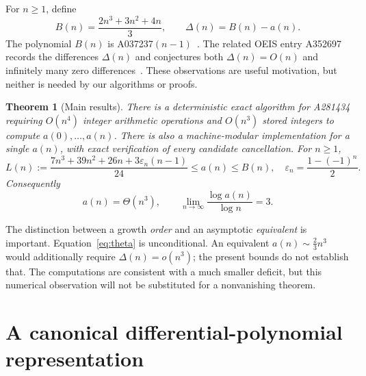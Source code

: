 \documentclass[11pt]{article}
\numberwithin{equation}{section}
\newtheorem{theorem}{Theorem}[section]
\theoremstyle{definition}
\theoremstyle{remark}
\newcommand{\epsn}{\varepsilon_n}
\begin{document}
For $n\ge1$, define
\begin{equation}\label{eq:B}
 B(n)=\frac{2n^3+3n^2+4n}{3},\qquad
 \Delta(n)=B(n)-a(n).
\end{equation}
The polynomial $B(n)$ is A037237$(n-1)$~\cite{oeis037237}. The related OEIS
entry A352697 records the differences $\Delta(n)$ and conjectures both
$\Delta(n)=O(n)$ and infinitely many zero differences~\cite{oeis352697}.
These observations are useful motivation, but neither is needed by our
algorithms or proofs.

\begin{theorem}[Main results]\label{thm:main}
There is a deterministic exact algorithm for A281434 requiring $O(n^4)$
integer arithmetic operations and $O(n^3)$ stored integers to compute
$a(0),\ldots,a(n)$. There is also a machine-modular implementation for a
single $a(n)$, with exact verification of every candidate cancellation.
For $n\ge1$,
\begin{equation}\label{eq:mainbounds}
 L(n):=\frac{7n^3+39n^2+26n+3\epsn(n-1)}{24}
 \le a(n)\le B(n),
 \quad \epsn=\frac{1-(-1)^n}{2}.
\end{equation}
Consequently
\begin{equation}\label{eq:theta}
 a(n)=\Theta(n^3),\qquad
 \lim_{n\to\infty}\frac{\log a(n)}{\log n}=3.
\end{equation}
\end{theorem}

The distinction between a growth \emph{order} and an asymptotic
\emph{equivalent} is important. Equation~\eqref{eq:theta} is unconditional.
An equivalent $a(n)\sim\tfrac23n^3$ would additionally require
$\Delta(n)=o(n^3)$; the present bounds do not establish that. The computations
are consistent with a much smaller deficit, but this numerical observation
will not be substituted for a nonvanishing theorem.

\section{A canonical differential-polynomial representation}
\end{document}
